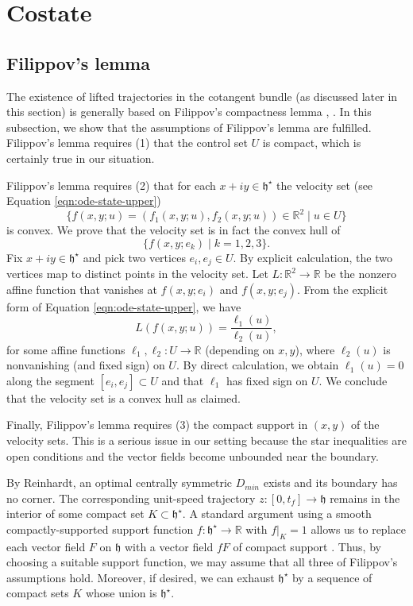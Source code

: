 \documentclass{article}
\theoremstyle{remark}
\newcommand{\ring}[1]{\mathbb{#1}}
\def\h{\mathfrak h}
\def\hstar{{\mathfrak h}^\star}
\def\DR{D_{min}}
\begin{document}
\section{Costate}

\subsection{Filippov's lemma}\label{sec:fil}

The existence of lifted trajectories in the cotangent bundle (as
discussed later in this section) is generally based on Filippov's
compactness lemma \cite[Th.10.1]{agrachev2013control},
\cite[\S4.5]{liberzon2012calculus}.  In this subsection, we show that
the assumptions of Filippov's lemma are fulfilled.  Filippov's lemma
requires (1) that the control set $U$ is compact, which is certainly
true in our situation.

Filippov's lemma requires (2) that for each $x+i y\in \hstar$ 
 the velocity set (see Equation
\ref{eqn:ode-state-upper})
\[
\{f(x,y;u)=(f_1(x,y;u),f_2(x,y;u))\in \ring{R}^2\mid u\in U\}
\]
is convex.  We prove that the velocity set is in fact the
convex hull of 
\[
\{ f(x,y;e_k)\mid k=1,2,3\}.
\]
Fix $x+i y\in \hstar$ and pick two vertices $e_i,e_j\in U$.  
By explicit calculation, the two vertices map to distinct points
in the velocity set.
Let $L:\ring{R}^2\to \ring{R}$ be the nonzero affine function that
vanishes at $f(x,y;e_i)$ and $f(x,y;e_j)$.  From the explicit form of
Equation \ref{eqn:ode-state-upper}, we have
\[
L(f(x,y;u)) = \frac{\ell_1( u)}{\ell_2(u)},
\]
for some affine functions $\ell_1,\ell_2:U\to \ring{R}$ (depending on
$x,y$), where $\ell_2(u)$ is nonvanishing (and fixed sign) on $U$.  By
direct calculation,
we obtain $\ell_1(u)=0$ along the segment $[e_i,e_j]\subset U$ and
that $\ell_1$ has fixed sign on $U$.  We conclude that the velocity
set is a  convex hull as claimed.


Finally, Filippov's lemma requires (3) the compact support in
$(x,y)$ of the velocity sets.  This is a serious issue in our setting
because the star inequalities are open conditions and the vector
fields become unbounded near the boundary.  

By Reinhardt, an optimal centrally symmetric $\DR$ exists and its
boundary has no corner.  The corresponding unit-speed trajectory
$z:[0,t_f]\to\h$ remains in the interior of some compact set $K\subset
\hstar$.  A standard argument using a smooth compactly-supported
support function $f:\hstar\to \ring{R}$ with $f|_K = 1$ allows us to
replace each vector field $F$ on $\h$ with a vector field $f F$ of
compact support \cite[Remark 10.5]{agrachev2013control}.  Thus, by
choosing a suitable support function, we may assume that all three of
Filippov's assumptions hold.  Moreover, if desired, we can exhaust
$\hstar$ by a sequence of compact sets $K$ whose union is $\hstar$.
\end{document}
